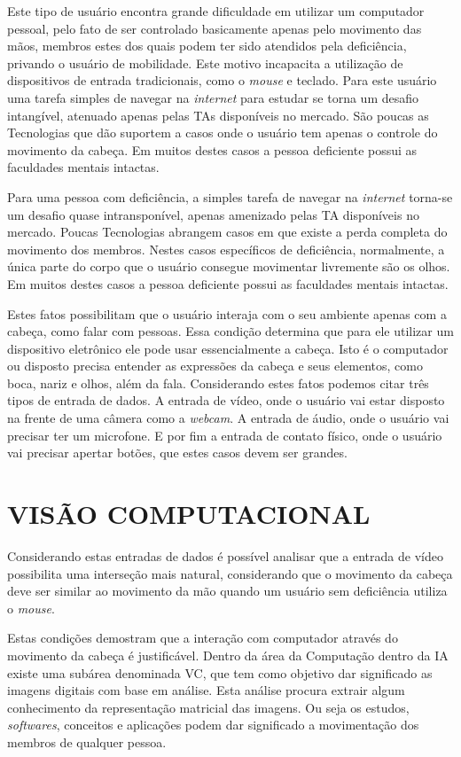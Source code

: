 Este tipo de usuário encontra grande dificuldade em utilizar um computador pessoal, pelo fato de ser controlado basicamente apenas pelo movimento das mãos, membros estes dos quais podem ter sido atendidos pela deficiência, privando o usuário de mobilidade. Este motivo incapacita a utilização de dispositivos de entrada tradicionais, como o \textit{mouse} e teclado. Para este usuário uma tarefa simples de navegar na \textit{internet} para estudar se torna um desafio intangível, atenuado apenas pelas TAs disponíveis no mercado. São poucas as Tecnologias que dão suportem a casos onde o usuário tem apenas o controle do movimento da cabeça. Em muitos destes casos a pessoa deficiente possui as faculdades mentais intactas.

Para uma pessoa com deficiência, a simples tarefa de navegar na \textit{internet} torna-se um desafio quase intransponível, apenas amenizado pelas TA disponíveis no mercado. Poucas Tecnologias abrangem casos em que existe a perda completa do movimento dos membros. Nestes casos específicos de deficiência, normalmente, a única parte do corpo que o usuário consegue movimentar livremente são os olhos. Em muitos destes casos a pessoa deficiente possui as faculdades mentais intactas.

Estes fatos possibilitam que o usuário interaja com o seu ambiente apenas com a cabeça, como falar com pessoas. Essa condição determina que para ele utilizar um dispositivo eletrônico ele pode usar essencialmente a cabeça. Isto é o computador ou disposto precisa entender as expressões da cabeça e seus elementos, como boca, nariz e olhos, além da fala. Considerando estes fatos podemos citar três tipos de entrada de dados. A entrada de vídeo, onde o usuário vai estar disposto na frente de uma câmera como a \textit{webcam}. A entrada de áudio, onde o usuário vai precisar ter um microfone. E por fim a entrada de contato físico, onde o usuário vai precisar apertar botões, que estes casos devem ser grandes. 

\section{VISÃO COMPUTACIONAL}\label{Sub:vc}
Considerando estas entradas de dados é possível analisar que a entrada de vídeo possibilita uma interseção mais natural, considerando que o movimento da cabeça deve ser similar ao movimento da mão quando um usuário sem deficiência utiliza o \textit{mouse}.

Estas condições demostram que a interação com computador através do movimento da cabeça é justificável. Dentro da área da Computação dentro da IA existe uma subárea denominada VC, que tem como objetivo dar significado as imagens digitais com base em análise. Esta análise procura extrair algum conhecimento da representação matricial das imagens. Ou seja os estudos, \textit{softwares}, conceitos e aplicações podem dar significado a movimentação dos membros de qualquer pessoa. 

